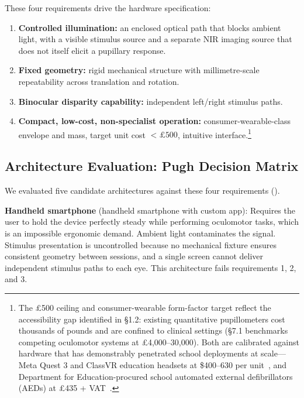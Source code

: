 These four requirements drive the hardware specification:
\begin{enumerate}
    \item \textbf{Controlled illumination:} an enclosed optical path that blocks ambient light, with a visible stimulus source and a separate NIR imaging source that does not itself elicit a pupillary response.
    \item \textbf{Fixed geometry:} rigid mechanical structure with millimetre-scale repeatability across translation and rotation.
    \item \textbf{Binocular disparity capability:} independent left/right stimulus paths.
    \item \textbf{Compact, \todo low-cost, non-specialist operation:} consumer-wearable-class envelope and mass, target unit cost $<\pounds 500$, intuitive interface.\footnote{The \pounds 500 ceiling and consumer-wearable form-factor target reflect the accessibility gap identified in §1.2: existing quantitative pupillometers cost thousands of pounds and are confined to clinical settings (§7.1 benchmarks competing oculomotor systems at \pounds 4{,}000--30{,}000). Both are calibrated against hardware that has demonstrably penetrated school deployments at scale---Meta Quest 3 and ClassVR education headsets at \$400--630 per unit~\cite{metaedu, classvr}, and Department for Education-procured school automated external defibrillators (AEDs) at \pounds 435 + VAT~\cite{dfeaed}.}
\end{enumerate}

\subsection{Architecture Evaluation: Pugh Decision Matrix}
\label{sec:hw-pugh-matrix}

We evaluated five candidate architectures against these four requirements ().

\textbf{Handheld smartphone} (handheld smartphone with custom app): Requires the user to hold the device perfectly steady while performing oculomotor tasks, which is an impossible ergonomic demand. Ambient light contaminates the  signal. Stimulus presentation is uncontrolled because no mechanical fixture ensures consistent geometry between sessions, and a single screen cannot deliver independent stimulus paths to each eye. This architecture fails requirements 1, 2, and 3.

